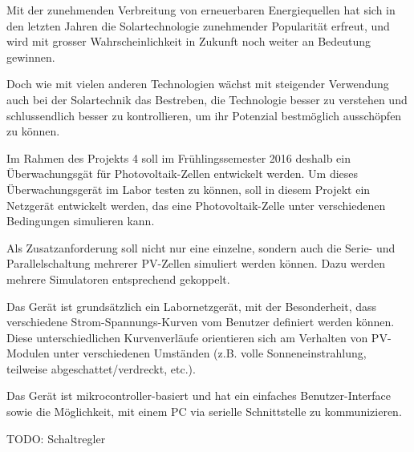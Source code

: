 Mit der  zunehmenden Verbreitung von  erneuerbaren Energiequellen hat  sich in
den letzten Jahren die Solartechnologie zunehmender Popularit\"at erfreut, und
wird  mit  grosser Wahrscheinlichkeit  in  Zukunft  noch weiter  an  Bedeutung
gewinnen.

Doch wie  mit vielen anderen  Technologien w\"achst mit  steigender Verwendung
auch bei der  Solartechnik das Bestreben, die Technologie  besser zu verstehen
und  schlussendlich besser  zu kontrollieren,  um ihr  Potenzial bestm\"oglich
aussch\"opfen zu k\"onnen.

Im  Rahmen  des  Projekts  4  soll im  Fr\"uhlingssemester  2016  deshalb  ein
\"Uberwachungsg\"at  f\"ur  Photovoltaik-Zellen entwickelt  werden. Um  dieses
\"Uberwachungsger\"at im Labor testen zu  k\"onnen, soll in diesem Projekt ein
Netzger\"at entwickelt werden, das eine Photovoltaik-Zelle unter verschiedenen
Bedingungen simulieren kann.

Als Zusatzanforderung  soll nicht nur  eine einzelne, sondern auch  die Serie-
und  Parallelschaltung  mehrerer  PV-Zellen  simuliert  werden  k\"onnen. Dazu
werden mehrere Simulatoren entsprechend gekoppelt.

Das Ger\"at  ist grunds\"atzlich  ein Labornetzger\"at, mit  der Besonderheit,
dass  verschiedene   Strom-Spannungs-Kurven  vom  Benutzer   definiert  werden
k\"onnen. Diese   unterschiedlichen  Kurvenverl\"aufe   orientieren  sich   am
Verhalten  von   PV-Modulen  unter   verschiedenen  Umst\"anden   (z.B.  volle
Sonneneinstrahlung, teilweise abgeschattet/verdreckt, etc.).

Das   Ger\"at    ist   mikrocontroller-basiert    und   hat    ein   einfaches
Benutzer-Interface  sowie  die  M\"oglichkeit,   mit  einem  PC  via  serielle
Schnittstelle zu kommunizieren.


TODO: Schaltregler
